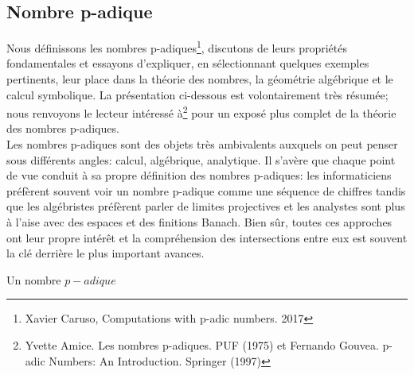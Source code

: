 \subsection{Nombre p-adique}
Nous définissons les nombres p-adiques\footnote{Xavier Caruso, Computations with p-adic numbers. 2017}, discutons de leurs propriétés fondamentales et essayons d'expliquer, en sélectionnant quelques exemples pertinents, leur place dans la théorie des nombres, la géométrie algébrique et le calcul symbolique. La présentation ci-dessous est volontairement très résumée; nous renvoyons le lecteur intéressé à\footnote{Yvette Amice. Les nombres p-adiques. PUF (1975) et Fernando Gouvea. p-adic Numbers: An Introduction. Springer (1997) } pour un exposé plus complet de la théorie des nombres p-adiques.
\\
Les nombres p-adiques sont des objets très ambivalents auxquels on peut penser sous différents angles:
calcul, algébrique, analytique. Il s'avère que chaque point de vue conduit à sa propre définition
des nombres p-adiques: les informaticiens préfèrent souvent voir un nombre p-adique comme une séquence de
chiffres tandis que les algébristes préfèrent parler de limites projectives et les analystes sont plus à l'aise
avec des espaces et des finitions Banach. Bien sûr, toutes ces approches ont leur propre intérêt
et la compréhension des intersections entre eux est souvent la clé derrière le plus important
avances.
\begin{definition}
Un nombre $p-adique$
\end{definition}
